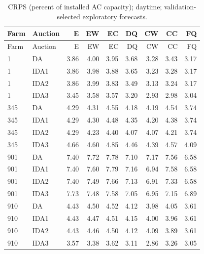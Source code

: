 \documentclass[11pt,a4paper]{article}
\begin{document}
\begin{longtable}{llrrrrrrr}
\caption{CRPS (percent of installed AC capacity); daytime; validation-selected exploratory forecasts.}\\
\toprule Farm & Auction & E & EW & EC & DQ & CW & CC & FQ \\
\midrule\endfirsthead
\toprule Farm & Auction & E & EW & EC & DQ & CW & CC & FQ \\
\midrule\endhead
1 & DA & 3.86 & 4.00 & 3.95 & 3.68 & 3.28 & 3.43 & 3.17 \\
1 & IDA1 & 3.86 & 3.98 & 3.88 & 3.65 & 3.23 & 3.28 & 3.17 \\
1 & IDA2 & 3.86 & 3.99 & 3.83 & 3.49 & 3.13 & 3.24 & 3.17 \\
1 & IDA3 & 3.45 & 3.58 & 3.57 & 3.20 & 2.93 & 2.98 & 3.04 \\
\midrule
345 & DA & 4.29 & 4.31 & 4.55 & 4.18 & 4.19 & 4.54 & 3.74 \\
345 & IDA1 & 4.29 & 4.30 & 4.48 & 4.35 & 4.20 & 4.38 & 3.74 \\
345 & IDA2 & 4.29 & 4.23 & 4.40 & 4.07 & 4.07 & 4.21 & 3.74 \\
345 & IDA3 & 4.66 & 4.60 & 4.85 & 4.46 & 4.39 & 4.57 & 4.09 \\
\midrule
901 & DA & 7.40 & 7.72 & 7.78 & 7.10 & 7.17 & 7.56 & 6.58 \\
901 & IDA1 & 7.40 & 7.60 & 7.79 & 7.16 & 6.94 & 7.58 & 6.58 \\
901 & IDA2 & 7.40 & 7.49 & 7.66 & 7.13 & 6.91 & 7.33 & 6.58 \\
901 & IDA3 & 7.73 & 7.48 & 7.58 & 7.05 & 6.95 & 7.15 & 6.89 \\
\midrule
910 & DA & 4.43 & 4.50 & 4.52 & 4.12 & 3.98 & 4.05 & 3.61 \\
910 & IDA1 & 4.43 & 4.47 & 4.51 & 4.15 & 4.00 & 3.96 & 3.61 \\
910 & IDA2 & 4.43 & 4.46 & 4.50 & 4.12 & 4.09 & 3.89 & 3.61 \\
910 & IDA3 & 3.57 & 3.38 & 3.62 & 3.11 & 2.86 & 3.26 & 3.05 \\
\midrule
\bottomrule\end{longtable}
\normalsize
\small
\end{document}
